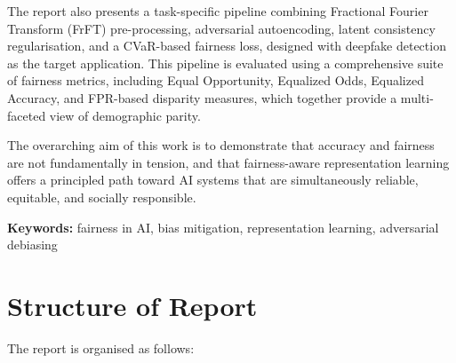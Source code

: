 \documentclass[a4paper,12pt,twoside]{report}
\begin{document}
The report also presents a task-specific pipeline combining Fractional
Fourier Transform (FrFT) pre-processing, adversarial autoencoding,
latent consistency regularisation, and a CVaR-based fairness loss,
designed with deepfake detection as the target application.  This
pipeline is evaluated using a comprehensive suite of fairness metrics,
including Equal Opportunity, Equalized Odds, Equalized Accuracy, and
FPR-based disparity measures, which together provide a multi-faceted
view of demographic parity.

The overarching aim of this work is to demonstrate that accuracy and
fairness are not fundamentally in tension, and that fairness-aware
representation learning offers a principled path toward AI systems
that are simultaneously reliable, equitable, and socially responsible.

\bigskip

\noindent\textbf{Keywords:} fairness in AI, bias mitigation, representation learning, adversarial debiasing
\cleardoublepage
\tableofcontents

\cleardoublepage
\listoffigures
{}

\cleardoublepage
\listoftables
{}

\cleardoublepage
\renewcommand{\nomname}{List of Abbreviations}
\printnomenclature[3cm]

\cleardoublepage
\chapter*{Structure of Report}
\label{ch:structure}


The report is organised as follows:
\end{document}
